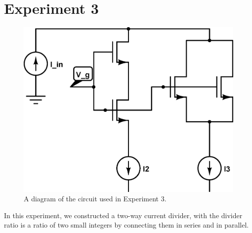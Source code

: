 \section*{Experiment 3}

\begin{figure}[H]
\centering
\includegraphics[width=0.65\linewidth]{../Figures/Experiment3CircuitDiagram2.eps}
\caption{A diagram of the circuit used in Experiment 3.}
\label{fig:ald1106}
\end{figure}


In this experiment, we constructed a two-way current divider, with the divider ratio is a ratio of
two small integers by connecting them in series and in parallel. 
